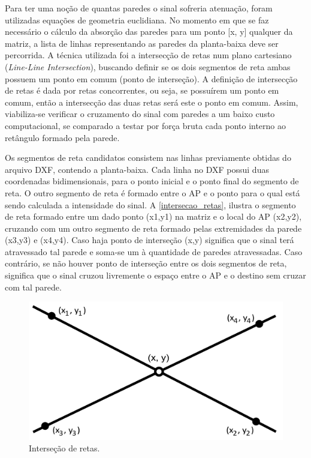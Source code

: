 \documentclass[
	12pt,				%
	twoside,			%
	a4paper,			%
	english,			%
	french,				%
	spanish,			%
	brazil				%
	]{abntex2}
\begin{document}
Para ter uma noção de quantas paredes o sinal sofreria atenuação, foram
utilizadas equações de geometria euclidiana. No momento em que se faz
necessário o cálculo da absorção das paredes para um ponto {[}x, y{]}
qualquer da matriz, a lista de linhas representando as paredes da
planta-baixa deve ser percorrida. A técnica utilizada foi a intersecção
de retas num plano cartesiano (\emph{Line-Line Intersection}), buscando
definir se os dois segmentos de reta ambas possuem um ponto em comum
(ponto de interseção). A definição de intersecção de retas é dada por
retas concorrentes, ou seja, se possuírem um ponto em comum, então a
intersecção das duas retas será este o ponto em comum. Assim,
viabiliza-se verificar o cruzamento do sinal com paredes a um baixo
custo computacional, se comparado a testar por força bruta cada ponto
interno ao retângulo formado pela parede.

Os segmentos de reta candidatos consistem nas linhas previamente obtidas
do arquivo DXF, contendo a planta-baixa. Cada linha no DXF possui duas
coordenadas bidimensionais, para o ponto inicial e o ponto final do
segmento de reta. O outro segmento de reta é formado entre o AP e o
ponto para o qual está sendo calculada a intensidade do sinal. A
\autoref{intersecao_retas}, ilustra o segmento de reta formado entre um
dado ponto (x1,y1) na matriz e o local do AP (x2,y2), cruzando com um
outro segmento de reta formado pelas extremidades da parede (x3,y3) e
(x4,y4). Caso haja ponto de interseção (x,y) significa que o sinal terá
atravessado tal parede e soma-se um à quantidade de paredes
atravessadas. Caso contrário, se não houver ponto de interseção entre os
dois segmentos de reta, significa que o sinal cruzou livremente o espaço
entre o AP e o destino sem cruzar com tal parede.

\begin{figure}[ht]
    \caption{\label{intersecao_retas} Interseção de retas.}
    \begin{center}
        \includegraphics[scale=0.5]{imagens/inter.jpg}
    \end{center}
\end{figure}
\end{document}
